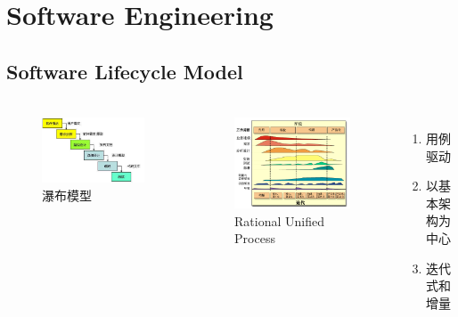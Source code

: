 \section{Software Engineering}
\subsection{Software Lifecycle Model}
\begin{frame}
  \frametitle{\subsecname}
  \begin{columns}[t]
    \begin{figure}
      \includegraphics[scale=.3]{images/pubu.jpg}
      \caption{瀑布模型}
    \end{figure}
    \begin{figure}
      \includegraphics[scale=.2]{images/rup.png}
      \caption{Rational Unified Process}
    \end{figure}
    \begin{enumerate}
      \item 用例驱动
      \item 以基本架构为中心
      \item 迭代式和增量
    \end{enumerate}
  \end{columns}
\end{frame}

